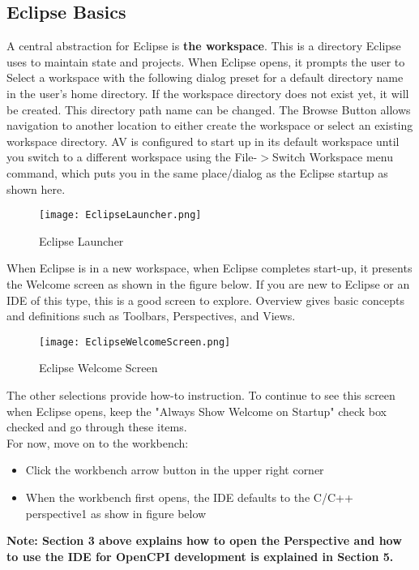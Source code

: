 \newpage
\setcounter{secnumdepth}{1} %
\begin{appendices}
\appendix
\section{Eclipse Basics}
A central abstraction for Eclipse is \textbf{the workspace}. This is a directory Eclipse uses to maintain state and projects. When Eclipse opens, it prompts the user to Select a workspace with the following dialog preset for a default directory name in the user’s home directory. If the workspace directory does not exist yet, it will be created. This directory path name can be changed. The Browse Button allows navigation to another location to either create the workspace or select an existing workspace directory.  AV is configured to start up in its default workspace until you switch to a different workspace using the File-$>$Switch Workspace menu command, which puts you in the same place/dialog as the Eclipse startup as shown here.
 \begin{figure}[h!]
	\centering
	\caption{Eclipse Launcher}{}
	\texttt{[image: EclipseLauncher.png]}
 \end{figure}

When Eclipse is in a new workspace, when Eclipse completes start-up, it presents the Welcome screen as shown in the figure below. If you are new to Eclipse or an IDE of this type, this is a good screen to explore. Overview gives basic concepts and definitions such as Toolbars, Perspectives, and Views.
\begin{figure}[h!]
	\centering
	\caption{Eclipse Welcome Screen}{}
	\texttt{[image: EclipseWelcomeScreen.png]}
 \end{figure}
The other selections provide how-to instruction. To continue to see this screen when Eclipse opens, keep the "Always Show Welcome on Startup" check box checked and go through these items. \\

For now, move on to the workbench:
\begin{itemize}
\item Click the workbench arrow button in the upper right corner
\item When the workbench first opens, the IDE defaults to the C/C++ perspective1 as show in figure below
\end{itemize}
 {\textbf {Note: Section 3 above explains how to open the Perspective and how to use the IDE for OpenCPI development is explained in Section 5.}}\\


\end{appendices}

